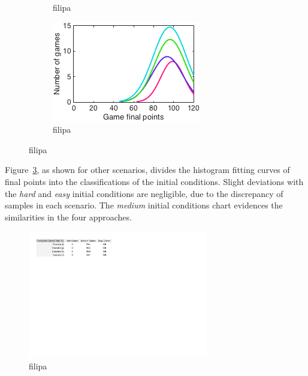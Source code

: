 \begin{figure}[h]
\begin{subfigure}[h]{0.32\textwidth}
                \caption{filipa}
                \label{fig:FGHImedium}
        \end{subfigure}
        \begin{subfigure}[h]{0.32\textwidth}
                \includegraphics[width=\textwidth]{./img/4/FGHIeasy}
                \caption{filipa}
                \label{fig:FGHIeasy}
        \end{subfigure}
        \caption{filipa}
        \label{fig:FGHI-CH}
\end{figure}

Figure~\ref{fig:FGHI-CH}, as shown for other scenarios, divides the histogram fitting curves of final points into the classifications of the initial conditions.
Slight deviations with the \emph{hard} and \emph{easy} initial conditions are negligible, due to the discrepancy of samples in each scenario.
The \emph{medium} initial conditions chart evidences the similarities in the four approaches.

\begin{figure}[h!]
  \centering
    \includegraphics[width=0.7\textwidth]{./img/4/FGHI-fgr}
  \caption{filipa}
\label{fig:FGHI-fgr}
\end{figure}

